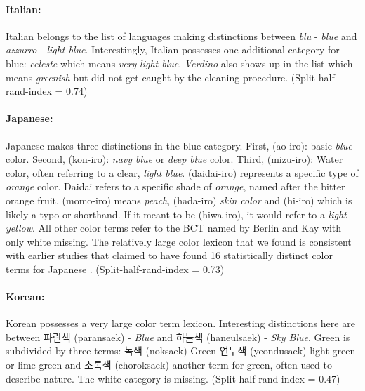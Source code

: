 \paragraph{Italian:}
Italian belongs to the list of languages making distinctions between \textit{blu} - \textit{blue} and \textit{azzurro }- \textit{light blue}. Interestingly, Italian possesses one additional category for blue: \textit{celeste} which means\textit{ very} \textit{light blue}.
\textit{Verdino} also shows up in the list which means \textit{greenish} but did not get caught by the cleaning procedure.
(Split-half-rand-index = 0.74)

\paragraph{Japanese:}
Japanese makes three distinctions in the blue category.
First,  (ao-iro): basic \textit{blue} color. Second,  (kon-iro): \textit{navy blue} or \textit{deep blue} color. Third,  (mizu-iro): Water color, often referring to a clear, \textit{light blue}.
 (daidai-iro) represents a specific type of \textit{orange} color. Daidai refers to a specific shade of \textit{orange}, named after the bitter orange fruit.
 (momo-iro) means \textit{peach},  (hada-iro) \textit{skin color} and  (hi-iro) which is likely a typo or shorthand. If it meant to be  (hiwa-iro), it would refer to a \textit{light yellow}.
All other color terms refer to the BCT named by Berlin and Kay with only white missing.
The relatively large color lexicon that we found is consistent with earlier studies that claimed to have found 16 statistically distinct color terms for Japanese \parencite{kurikiModern2017}.
(Split-half-rand-index = 0.73)

\paragraph{Korean:}
Korean possesses a very large color term lexicon. Interesting distinctions here are between \textkorean{파란색} (paransaek) - \textit{Blue} and 
\textkorean{하늘색} (haneulsaek) - \textit{Sky Blue}. 
Green is subdivided by three terms: 
\textkorean{녹색} (noksaek) Green
\textkorean{연두색} (yeondusaek) light green or lime green and
\textkorean{초록색} (choroksaek) another term for green, often used to describe nature.
The white category is missing.
(Split-half-rand-index = 0.47)


